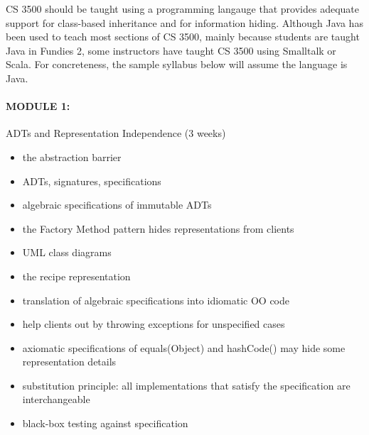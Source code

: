 \documentclass[11pt]{article}
\begin{document}
CS 3500 should be taught using a programming langauge that
provides adequate support for class-based inheritance and for
information hiding.  Although Java has been used to teach most
sections of CS 3500, mainly because students are taught Java in
Fundies 2, some instructors have taught CS 3500 using Smalltalk
or Scala.  For concreteness, the sample syllabus below will
assume the language is Java.



\paragraph{MODULE 1:}
%
ADTs and Representation Independence (3 weeks)
%
\begin{itemize}
\item the abstraction barrier
\item ADTs, signatures, specifications
\item algebraic specifications of immutable ADTs
\item the Factory Method pattern hides representations from clients
\item UML class diagrams
\item the recipe representation
\item translation of algebraic specifications into idiomatic OO code
\item help clients out by throwing exceptions for unspecified cases
\item axiomatic specifications of equals(Object) and hashCode()
      may hide some representation details
\item substitution principle:
      all implementations that satisfy the specification are interchangeable
\item black-box testing against specification
\end{itemize}
\end{document}
